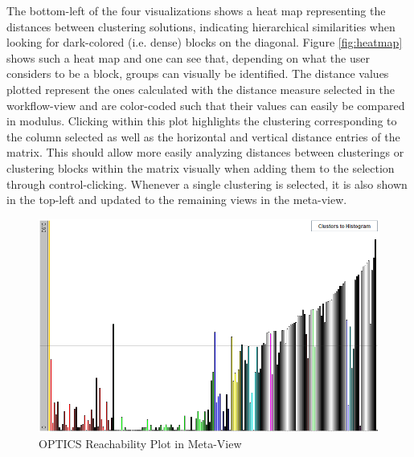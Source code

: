 \documentclass[
	a4paper,
	english,
	twoside,
	openright,               
	11pt                            
	]{report}
\begin{document}
The bottom-left of the four visualizations shows a heat map representing the distances between clustering solutions, indicating hierarchical similarities when looking for dark-colored (i.e. dense) blocks on the diagonal. Figure \ref{fig:heatmap} shows such a heat map and one can see that, depending on what the user considers to be a block, groups can visually be identified. The distance values plotted represent the ones calculated with the distance measure selected in the workflow-view and are color-coded such that their values can easily be compared in modulus. Clicking within this plot highlights the clustering corresponding to the column selected as well as the horizontal and vertical distance entries of the matrix. This should allow more easily analyzing distances between clusterings or clustering blocks within the matrix visually when adding them to the selection through control-clicking. Whenever a single clustering is selected, it is also shown in the top-left and updated to the remaining views in the meta-view.

\begin{figure}[h]
	\centering
	\includegraphics[scale=.45]{reach-plot}
	\caption{OPTICS Reachability Plot in Meta-View }
	\label{fig:opticsplot}
\end{figure}
\end{document}
